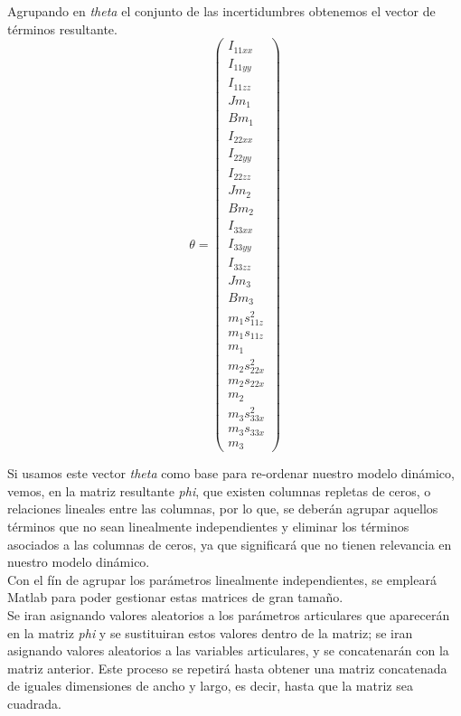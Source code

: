 	Agrupando en \textit{theta} el conjunto de las incertidumbres obtenemos el vector de términos resultante.
	\begin{equation}
		\theta=
			\begin{pmatrix}
				I_{11xx} \\
				I_{11yy}\\
				I_{11zz}\\
				Jm_{1} \\
				Bm_{1} \\
				I_{22xx} \\
				I_{22yy}\\
				I_{22zz}\\
				Jm_{2} \\
				Bm_{2} \\
				I_{33xx} \\
				I_{33yy}\\
				I_{33zz}\\
				Jm_{3} \\
				Bm_{3} \\
				m_{1}s_{11z}^{2} \\
				m_{1}s_{11z} \\
				m_{1}\\
				m_{2}s_{22x}^{2} \\
				m_{2}s_{22x} \\
				m_{2}\\
				m_{3}s_{33x}^{2} \\
				m_{3}s_{33x} \\
				m_{3}
				\end{pmatrix}
		\end{equation}

		Si usamos este vector \textit{theta} como base para re-ordenar nuestro modelo dinámico, vemos, en la matriz resultante \textit{phi},
		que existen columnas repletas de ceros, o relaciones lineales entre las columnas, por lo que, se deberán
		agrupar aquellos términos que no sean linealmente independientes y eliminar los términos asociados
		a las columnas de ceros, ya que significará que no tienen relevancia en nuestro modelo dinámico.\\

		Con el fín de agrupar los parámetros linealmente independientes, se empleará Matlab para poder gestionar estas matrices de gran tamaño.\\
		Se iran asignando valores aleatorios a los parámetros articulares que aparecerán en la matriz \textit{phi} y se sustituiran estos valores dentro de la matriz; se iran asignando valores aleatorios a las variables articulares,  y se concatenarán
		con la matriz anterior. Este proceso se repetirá hasta obtener una matriz concatenada de iguales dimensiones de ancho y largo, es decir, hasta que la matriz sea cuadrada.\\

